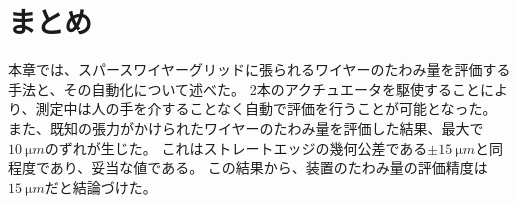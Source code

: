 \documentclass[../../main.tex]{subfiles}
\begin{document}


\section{まとめ}
本章では、スパースワイヤーグリッドに張られるワイヤーのたわみ量を評価する手法と、その自動化について述べた。
2本のアクチュエータを駆使することにより、測定中は人の手を介することなく自動で評価を行うことが可能となった。
また、既知の張力がかけられたワイヤーのたわみ量を評価した結果、最大で$\SI{10}{\micro m}$のずれが生じた。
これはストレートエッジの幾何公差である$\pm\SI{15}{\micro m}$と同程度であり、妥当な値である。
この結果から、装置のたわみ量の評価精度は$\SI{15}{\micro m}$だと結論づけた。
\end{document}

